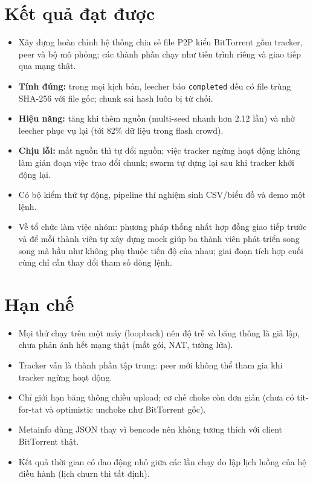 \documentclass[12pt,a4paper,oneside]{report}
\begin{document}
\section{Kết quả đạt được}
\begin{itemize}
  \item Xây dựng hoàn chỉnh hệ thống chia sẻ file P2P kiểu BitTorrent gồm tracker, peer và bộ mô phỏng; các thành phần chạy như tiến trình riêng và giao tiếp qua mạng thật.
  \item \textbf{Tính đúng:} trong mọi kịch bản, leecher báo \texttt{completed} đều có file trùng SHA-256 với file gốc; chunk sai hash luôn bị từ chối.
  \item \textbf{Hiệu năng:} tăng khi thêm nguồn (multi-seed nhanh hơn 2.12 lần) và nhờ leecher phục vụ lại (tới 82\% dữ liệu trong flash crowd).
  \item \textbf{Chịu lỗi:} mất nguồn thì tự đổi nguồn; việc tracker ngừng hoạt động không làm gián đoạn việc trao đổi chunk; swarm tự dựng lại sau khi tracker khởi động lại.
  \item Có bộ kiểm thử tự động, pipeline thí nghiệm sinh CSV/biểu đồ và demo một lệnh.
  \item Về tổ chức làm việc nhóm: phương pháp thống nhất hợp đồng giao tiếp trước và để mỗi thành viên tự xây dựng mock giúp ba thành viên phát triển song song mà hầu như không phụ thuộc tiến độ của nhau; giai đoạn tích hợp cuối cùng chỉ cần thay đổi tham số dòng lệnh.
\end{itemize}

\section{Hạn chế}
\begin{itemize}
  \item Mọi thứ chạy trên một máy (loopback) nên độ trễ và băng thông là giả lập, chưa phản ánh hết mạng thật (mất gói, NAT, tường lửa).
  \item Tracker vẫn là thành phần tập trung: peer mới không thể tham gia khi tracker ngừng hoạt động.
  \item Chỉ giới hạn băng thông chiều upload; cơ chế choke còn đơn giản (chưa có tit-for-tat và optimistic unchoke như BitTorrent gốc).
  \item Metainfo dùng JSON thay vì bencode nên không tương thích với client BitTorrent thật.
  \item Kết quả thời gian có dao động nhỏ giữa các lần chạy do lập lịch luồng của hệ điều hành (lịch churn thì tất định).
\end{itemize}
\end{document}
